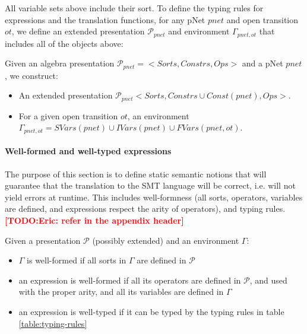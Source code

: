 \documentclass{lncs/llncs}
\newcommand{\TODO}[1]{\textcolor{red}{\textbf{[TODO:#1]}}}
\begin{document}
\def\EPres{\mathcal{P}}
\def\EEnv{\Gamma}

All variable sets above include their sort.
To define the typing rules for expressions and the translation
functions, for any pNet $pnet$ and open transition $ot$, we define an
extended presentation $\EPres_{pnet}$ and environment $\EEnv_{pnet,ot}$ that includes all of the
objects above:

\begin{definition}
  Given an algebra presentation $\mathcal{P}_{pnet}=<Sorts,Constrs,Ops>$ and a pNet $pnet$, we
  construct:
  \begin{itemize}
  \item An extended presentation $\EPres_{pnet}<Sorts,Constrs \cup Const(pnet),Ops>$.
  \item For a given open transition $ot$, an environment
    $\EEnv_{pnet,ot}=SVars(pnet) \cup IVars(pnet) \cup FVars(pnet,ot)$. 
  \end{itemize} 
\end{definition}



\paragraph{Well-formed and well-typed expressions}

The purpose of this section is to define static semantic notions that
will guarantee that the translation to the SMT language will be
correct, i.e. will not yield errors at runtime. This includes
well-formness (all sorts, operators, variables are defined, and
expressions respect the arity of operators), and typing rules.
\TODO{Eric: refer in the appendix header}

\begin{definition}
  Given a presentation $\EPres$ (possibly extended) and an environment $\EEnv$:
  \begin{itemize}
  \item $\EEnv$ is well-formed if all sorts in $\EEnv$ are
    defined in $\EPres$
  \item an expression is well-formed if all its operators are defined
    in $\EPres$, and used with the proper arity, and all its
    variables are defined in $\EEnv$
  \item an expression is well-typed if it can be typed by the typing
    rules in table \ref{table:typing-rules}
  \end{itemize}
\end{definition}
\end{document}
